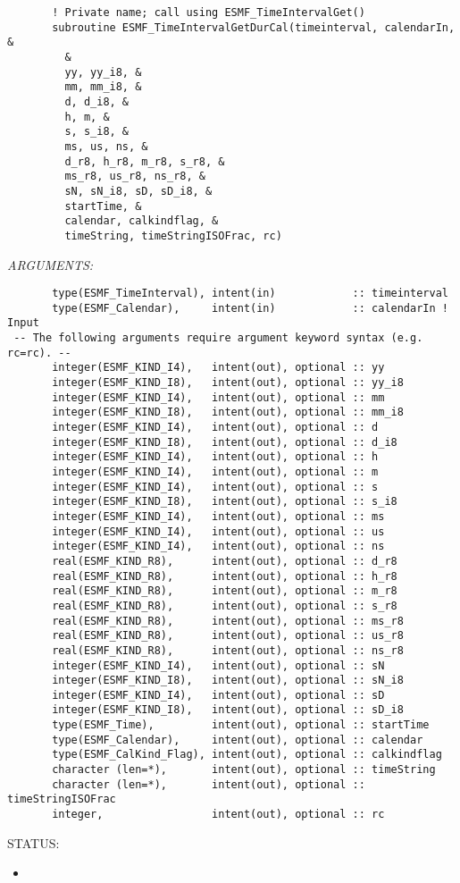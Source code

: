  
\begin{verbatim}       ! Private name; call using ESMF_TimeIntervalGet()
       subroutine ESMF_TimeIntervalGetDurCal(timeinterval, calendarIn, &
         &
         yy, yy_i8, &
         mm, mm_i8, &
         d, d_i8, &
         h, m, &
         s, s_i8, &
         ms, us, ns, &
         d_r8, h_r8, m_r8, s_r8, &
         ms_r8, us_r8, ns_r8, &
         sN, sN_i8, sD, sD_i8, &
         startTime, &
         calendar, calkindflag, &
         timeString, timeStringISOFrac, rc)
 \end{verbatim}{\em ARGUMENTS:}
\begin{verbatim}       type(ESMF_TimeInterval), intent(in)            :: timeinterval
       type(ESMF_Calendar),     intent(in)            :: calendarIn ! Input
 -- The following arguments require argument keyword syntax (e.g. rc=rc). --
       integer(ESMF_KIND_I4),   intent(out), optional :: yy
       integer(ESMF_KIND_I8),   intent(out), optional :: yy_i8
       integer(ESMF_KIND_I4),   intent(out), optional :: mm
       integer(ESMF_KIND_I8),   intent(out), optional :: mm_i8
       integer(ESMF_KIND_I4),   intent(out), optional :: d
       integer(ESMF_KIND_I8),   intent(out), optional :: d_i8
       integer(ESMF_KIND_I4),   intent(out), optional :: h
       integer(ESMF_KIND_I4),   intent(out), optional :: m
       integer(ESMF_KIND_I4),   intent(out), optional :: s
       integer(ESMF_KIND_I8),   intent(out), optional :: s_i8
       integer(ESMF_KIND_I4),   intent(out), optional :: ms
       integer(ESMF_KIND_I4),   intent(out), optional :: us
       integer(ESMF_KIND_I4),   intent(out), optional :: ns
       real(ESMF_KIND_R8),      intent(out), optional :: d_r8
       real(ESMF_KIND_R8),      intent(out), optional :: h_r8
       real(ESMF_KIND_R8),      intent(out), optional :: m_r8
       real(ESMF_KIND_R8),      intent(out), optional :: s_r8
       real(ESMF_KIND_R8),      intent(out), optional :: ms_r8
       real(ESMF_KIND_R8),      intent(out), optional :: us_r8
       real(ESMF_KIND_R8),      intent(out), optional :: ns_r8
       integer(ESMF_KIND_I4),   intent(out), optional :: sN
       integer(ESMF_KIND_I8),   intent(out), optional :: sN_i8
       integer(ESMF_KIND_I4),   intent(out), optional :: sD
       integer(ESMF_KIND_I8),   intent(out), optional :: sD_i8
       type(ESMF_Time),         intent(out), optional :: startTime
       type(ESMF_Calendar),     intent(out), optional :: calendar
       type(ESMF_CalKind_Flag), intent(out), optional :: calkindflag
       character (len=*),       intent(out), optional :: timeString
       character (len=*),       intent(out), optional :: timeStringISOFrac
       integer,                 intent(out), optional :: rc
 \end{verbatim}
{\sf STATUS:}
   \begin{itemize}
   \item{}
   \end{itemize}
  
